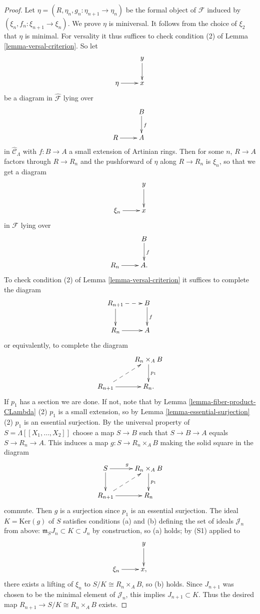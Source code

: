\begin{proof}
\medskip \noindent
Let $\eta = (R, \eta_{n}, g_n: \eta_{n+1} \to \eta_{n})$ be the formal 
object of $\mathcal{F}$ induced by $(\xi_{n}, f_{n}: \xi_{n+1} \to 
\xi_{n})$. We prove $\eta$ is miniversal. It follows from the choice of 
$\xi_{2}$ that $\eta$ is minimal.  For versality it thus suffices to check 
condition (2) of Lemma \ref{lemma-versal-criterion}.  So let
\[
\xymatrix{
            &  y \ar[d] \\
\eta \ar[r]  &  x
}
\]
be a diagram in $\widehat{\mathcal{F}}$ lying over
\[
\xymatrix{
         &   B  \ar[d]^{f} \\
R \ar[r] &   A 
}
\]
in $\widehat{\mathcal{C}}_\Lambda$ with $f: B \to A$ a small extension 
of Artinian rings. Then for some $n$, $R \to A$ factors through $R 
\to R_{n}$ and the pushforward of $\eta$ along $R \to R_n$ is 
$\xi_{n}$, so that we get a diagram
\[
\xymatrix{
            &  y \ar[d] \\
\xi_{n} \ar[r]  &  x
}
\]
in $\mathcal{F}$ lying over
\[
\xymatrix{
         &   B  \ar[d]^{f} \\
R_n \ar[r] &   A .
}
\]
To check condition (2) of Lemma \ref{lemma-versal-criterion} it suffices to 
complete the diagram
\[
\xymatrix{
R_{n+1} \ar[d] \ar@{-->}[r] & B \ar[d]^{f} \\
R_{n}   \ar[r] & A 
}
\]
or equivalently, to complete the diagram
\[
\xymatrix{
  &  R_{n} \times_{A} B \ar[d]^{p_1} \\
R_{n+1} \ar@{-->}[ur] \ar[r] &  R_{n} .
}
\]
If $p_1$ has a section we are done.  If not, note that by Lemma 
\ref{lemma-fiber-product-CLambda} (2) $p_1$ is a small extension, so by Lemma 
\ref{lemma-essential-surjection} (2) $p_1$ is an essential surjection. By the 
universal property of $S = \Lambda[[X_1, \dots, X_2]]$ choose a map $S 
\to B$ such that $S \to B \to A$ equals $S \to 
R_{n} \to A$.  This induces a map $g: S \to R_{n} \times_{A} B$ 
making the solid square in the diagram
\[
\xymatrix{
S \ar[d] \ar[r]^{g}  &  R_{n} \times_{A} B \ar[d]^{p_1} \\
R_{n+1} \ar@{-->}[ur] \ar[r] &  R_{n}
}
\]
commute. Then $g$ is a surjection since $p_1$ is an essential surjection. The 
ideal $K = \text{Ker}(g)$ of $S$ satisfies conditions (a) and (b) 
defining the set of ideals $\mathcal J_n$ from above: $\mathfrak{m}_SJ_n 
\subset K \subset J_n$ by construction, so (a) holds; by (S1) 
applied to
\[
\xymatrix{
            &  y \ar[d] \\
\xi_{n} \ar[r]  &  x,
}
\]
there exists a lifting of $\xi_n$ to $S/K \cong R_{n} \times_{A} B$, so (b) 
holds.  Since $J_{n+1}$ was chosen to be the minimal element of $\mathcal J_n$, 
this implies $J_{n+1} \subset K$.  Thus the desired map $R_{n+1} \to 
S/K \cong R_{n} \times_{A} B$ exists.
\end{proof}


